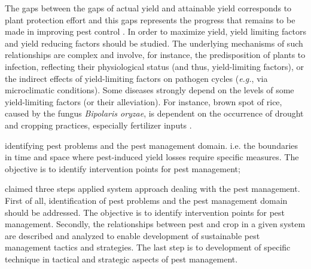 The gaps between the gaps of actual yield and attainable yield corresponds to plant protection effort and this gaps represents the progress that remains to be made in improving pest control \citep{OERKE:2006ct}. In order to maximize yield, yield limiting factors and yield reducing factors should be studied. The underlying mechanisms of such relationships are complex \citep{Zadoks:1979ts} and involve, for instance, the predisposition of plants to infection, reflecting their physiological status (and thus, yield-limiting factors), or the indirect effects of yield-limiting factors on pathogen cycles (\textit{e.g.}, via microclimatic conditions). Some diseases strongly depend on the levels of some yield-limiting factors (or their alleviation). For instance, brown spot of rice, caused by the fungus \textit{Bipolaris oryzae}, is dependent on the occurrence of drought and cropping practices, especially fertilizer inputs \citep{barnwal2013review}.





identifying pest problems and the pest management domain. i.e. the boundaries in time and space where pest-induced yield losses require specific measures. The objective is to identify intervention points for pest management;

\citet{teng1992implementing} claimed three steps applied system approach dealing with the pest management. First of all, identification of pest problems and the pest management domain should be addressed. The objective is to identify intervention points for pest management. Secondly, the relationships between pest and crop in a given system are described and analyzed to enable development of sustainable pest management tactics and strategies. The last step is to development of specific technique in tactical and strategic aspects of pest management.

